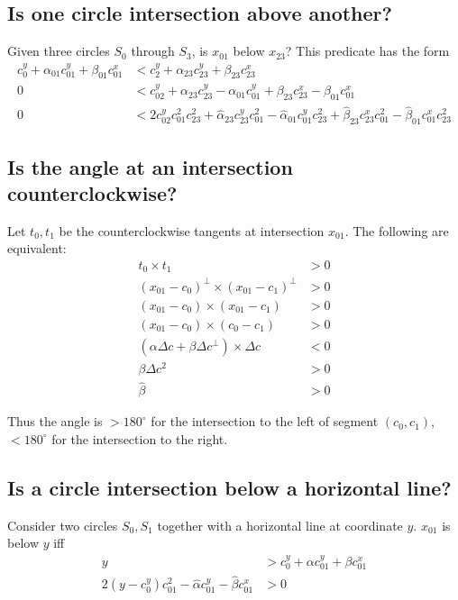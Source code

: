 \documentclass[11pt]{article}
\begin{document}
\subsection{Is one circle intersection above another?}

Given three circles $S_0$ through $S_3$, is $x_{01}$ below $x_{23}$?  This predicate has the form
\begin{align*}
c_0^y + \alpha_{01} c_{01}^y + \beta_{01} c_{01}^x &< c_2^y + \alpha_{23} c_{23}^y + \beta_{23} c_{23}^x \\
0 &< c_{02}^y + \alpha_{23} c_{23}^y - \alpha_{01} c_{01}^y + \beta_{23} c_{23}^x - \beta_{01} c_{01}^x \\
0 &< 2 c_{02}^y c_{01}^2 c_{23}^2 + \hat{\alpha}_{23} c_{23}^y c_{01}^2 - \hat{\alpha}_{01} c_{01}^y c_{23}^2 + \hat{\beta}_{23} c_{23}^x c_{01}^2 - \hat{\beta}_{01} c_{01}^x c_{23}^2
\end{align*}

\subsection{Is the angle at an intersection counterclockwise?}

Let $t_0, t_1$ be the counterclockwise tangents at intersection $x_{01}$.  The following are equivalent:
\begin{align*}
t_0 \times t_1 &> 0 \\
(x_{01} - c_0)^\perp \times (x_{01} - c_1)^\perp &> 0 \\
(x_{01} - c_0) \times (x_{01} - c_1) &> 0 \\
(x_{01} - c_0) \times (c_0 - c_1) &> 0 \\
(\alpha \Delta c + \beta \Delta c^\perp) \times \Delta c &< 0 \\
\beta \Delta c^2 &> 0 \\
\hat{\beta} &> 0
\end{align*}

Thus the angle is $> 180^\circ$ for the intersection to the left of segment $(c_0,c_1)$, $< 180^\circ$ for the intersection to the right.

\subsection{Is a circle intersection below a horizontal line?}

Consider two circles $S_0, S_1$ together with a horizontal line at coordinate $y$.  $x_{01}$ is below $y$ iff
\begin{align*}
y &> c_0^y + \alpha c_{01}^y + \beta c_{01}^x \\
2 (y-c_0^y) c_{01}^2 - \hat{\alpha} c_{01}^y - \hat{\beta} c_{01}^x &> 0
\end{align*}
\end{document}
